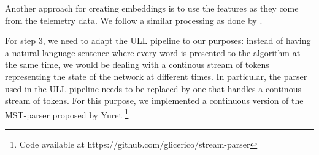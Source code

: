 Another approach for creating embeddings is to use the features as they come from the telemetry data.
We follow a similar processing as done by \cite{putina_telemetry-based_2018}.

For step 3, we need to adapt the ULL pipeline to our purposes: instead of having a natural language sentence where every word is presented to the algorithm at the same time, we would be dealing with a continous stream of tokens representing the state of the network at different times.
In particular, the parser used in the ULL pipeline needs to be replaced by one that handles a continous stream of tokens.
For this purpose, we implemented a continuous version of the MST-parser proposed by Yuret \cite{yuret_discovery_1998}\footnote{Code available at https://github.com/glicerico/stream-parser}
